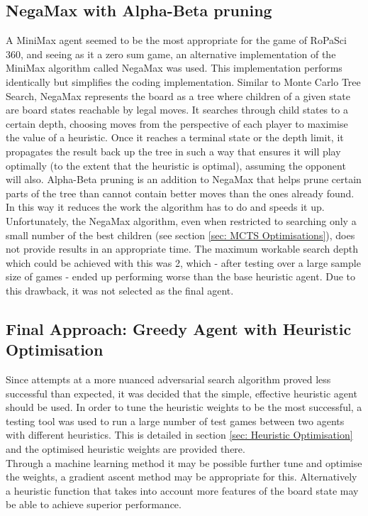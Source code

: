 \documentclass{article}
\begin{document}
\subsection{NegaMax with Alpha-Beta pruning}
A MiniMax agent seemed to be the most appropriate for the game of RoPaSci 360, and seeing as it a zero sum game, an alternative implementation of the MiniMax algorithm called NegaMax was used. This implementation performs identically but simplifies the coding implementation. Similar to Monte Carlo Tree Search, NegaMax represents the board as a tree where children of a given state are board states reachable by legal moves. It searches through child states to a certain depth, choosing moves from the perspective of each player to maximise the value of a heuristic. Once it reaches a terminal state or the depth limit, it propagates the result back up the tree in such a way that ensures it will play optimally (to the extent that the heuristic is optimal), assuming the opponent will also. Alpha-Beta pruning is an addition to NegaMax that helps prune certain parts of the tree than cannot contain better moves than the ones already found. In this way it reduces the work the algorithm has to do and speeds it up.\\[2mm]
Unfortunately, the NegaMax algorithm, even when restricted to searching only a small number of the best children (see section \ref{sec: MCTS Optimisations}), does not provide results in an appropriate time. The maximum workable search depth which could be achieved with this was 2, which - after testing over a large sample size of games - ended up performing worse than the base heuristic agent. Due to this drawback, it was not selected as the final agent.

\subsection{Final Approach: Greedy Agent with Heuristic Optimisation}
Since attempts at a more nuanced adversarial search algorithm proved less successful than expected, it was decided that the simple, effective heuristic agent should be used. In order to tune the heuristic weights to be the most successful, a testing tool was used to run a large number of test games between two agents with different heuristics. This is detailed in section \ref{sec: Heuristic Optimisation} and the optimised heuristic weights are provided there.\\[2mm]
Through a machine learning method it may be possible further tune and optimise the weights, a gradient ascent method may be appropriate for this. Alternatively a heuristic function that takes into account more features of the board state may be able to achieve superior performance.
\end{document}
